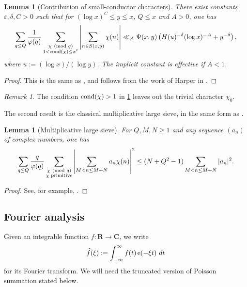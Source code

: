 \documentclass[reqno,11pt]{amsart}
\newtheorem{lemma}[theorem]{Lemma}
\theoremstyle{definition}
\theoremstyle{remark}
\newtheorem*{remark}{Remark}
\numberwithin{equation}{section}
\newcommand{\R}{\mathbf{R}}
\newcommand{\C}{\mathbf{C}}
\newcommand{\e}{\textnormal{e}}
\newcommand{\eps}{\varepsilon}
\renewcommand{\hat}{\widehat}
\newcommand{\cond}{\textnormal{cond}}
\renewcommand{\pmod}[1]{\ (\textnormal{mod } #1)}
\begin{document}
\begin{lemma}[Contribution of small-conductor characters] \label{lem:harper}
There exist constants $\eps, \delta, C > 0$ such that for $(\log x)^C \le y \le x$, $Q \le x$ and $A > 0$, one has
\[
    \sum_{q \le Q} \frac{1}{\varphi(q)} \sum_{\substack{\chi \pmod{q} \\ 1 < \cond(\chi) \le x^\eps}} 
    \left\vert \sum_{n \in S(x, y)} \chi(n) \right\vert \ll_A 
    \Psi(x, y) 
    \left(H(u)^{-\delta} (\log x)^{-A} + y^{-\delta} \right),
\]
where $u := (\log x)/(\log y)$. The implicit constant is effective if $A < 1$.
\end{lemma}

\begin{proof}
This is the same as \cite[Lemme 5]{drappeau2015theoremes}, and follows from the work of Harper in \cite[\S 3.3]{harper2012bombieri}.
\end{proof}

\begin{remark}
The condition $\cond(\chi) > 1$ in \cref{lem:harper} leaves out the trivial character $\chi_0$.
\end{remark}

The second result is the classical multiplicative large sieve, in the same form as \cite[Lemme 6]{drappeau2015theoremes}.

\begin{lemma}[Multiplicative large sieve] \label{lem:large-sieve}
For $Q, M, N \ge 1$ and any sequence $(a_n)$ of complex numbers, one has
\[
    \sum_{q \le Q} \frac{q}{\varphi(q)} \sum_{\substack{\chi \pmod{q} \\ \chi \textnormal{ primitive}}} 
    \left\vert 
    \sum_{M < n \le M+N} a_n \chi(n)
    \right\vert^2
    \le 
    (N + Q^2 - 1) 
    \sum_{M < n \le M+N} |a_n|^2.
\]
\end{lemma}

\begin{proof}
See, for example, \cite[Theorem 7.13]{iwaniec2021analytic}. 
\end{proof}


\subsection{Fourier analysis}
Given an integrable function $f : \R \to \C$, we write
\[
    \hat{f}(\xi) := \int_{-\infty}^\infty f(t)\, \e(-\xi t)\ dt
\]
for its Fourier transform. We will need the truncated version of Poisson summation stated below.
\end{document}
